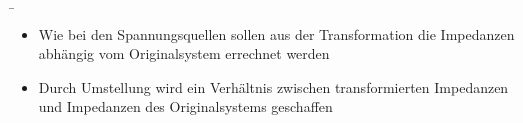 \begin{frame}
    \b{
        \begin{itemize}
            \item<2-> Wie bei den Spannungsquellen sollen aus der Transformation die Impedanzen abhängig vom Originalsystem errechnet werden
            \item<3-> Durch Umstellung wird ein Verhältnis zwischen transformierten Impedanzen und Impedanzen des Originalsystems geschaffen
        \end{itemize}
    }
\end{frame}
